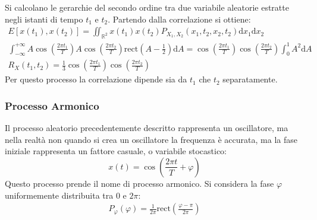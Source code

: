 \documentclass{article}
\newcommand{\rect}{\mathrm{rect}}
\newcommand{\df}{\mathrm{d}}
\numberwithin{equation}{subsection}
\begin{document}
Si calcolano le gerarchie del secondo ordine tra due variabile aleatorie estratte negli istanti di tempo $t_1$ e $t_2$. Partendo dalla correlazione si ottiene:
\begin{gather*}
    E[x(t_1),x(t_2)]=\displaystyle\iint_{\mathbb{R}^2}x(t_1)x(t_2)P_{X_1,X_2}(x_1,t_2,x_2,t_2)\df x_1\df x_2\\    
    \displaystyle\int_{-\infty}^{+\infty}A\cos\left(\frac{2\pi t_1}{T}\right)A\cos\left(\frac{2\pi t_2}{T}\right)\rect\displaystyle\left(A-\frac{1}{2}\right)\df A=\cos\left(\frac{2\pi t_1}{T}\right)\cos\left(\frac{2\pi t_2}{T}\right)\int_0^1A^2\df A\\
    R_X(t_1,t_2)=\displaystyle\frac{1}{3}\cos\left(\frac{2\pi t_1}{T}\right)\cos\left(\frac{2\pi t_2}{T}\right)
\end{gather*}
Per questo processo la correlazione dipende sia da $t_1$ che $t_2$ separatamente. 

\subsubsection{Processo Armonico}

Il processo aleatorio precedentemente descritto  rappresenta un oscillatore, ma nella realtà non quando si crea un oscillatore la frequenza è accurata, ma la fase iniziale rappresenta un fattore casuale, o 
variabile stocastico: 
\begin{equation*}
    x(t)=\displaystyle\cos\left(\frac{2\pi t}{T}+\varphi\right)
\end{equation*}
Questo processo prende il nome di processo armonico. 
Si considera la fase $\varphi$ uniformemente distribuita tra $0$ e $2\pi$:
\begin{gather*}
    P_{\varphi}(\varphi)=\displaystyle\frac{1}{2\pi}\rect\left(\frac{\varphi-\pi}{2\pi}\right)
\end{gather*}
\end{document}
